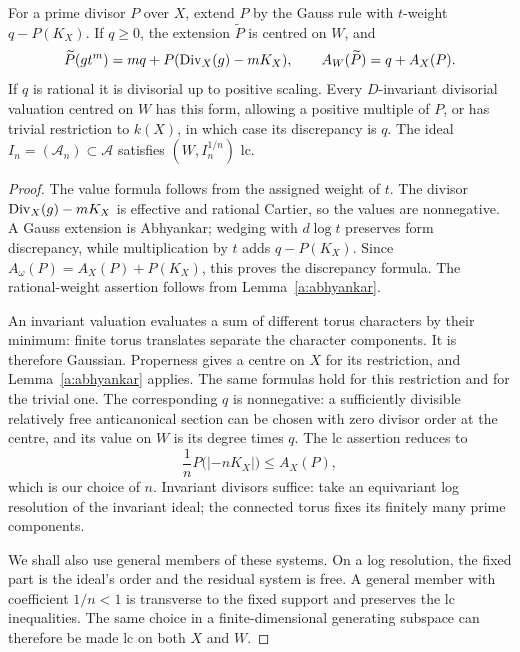 \begin{lemma}\label{a:cone-gauss}
For a prime divisor \(P\) over \(X\), extend \(P\) by the Gauss rule with
\(t\)-weight \(q-P(K_X)\). If \(q\geq0\), the extension \(\widetilde P\)
is centred on \(W\), and
\[
 \widetilde P(gt^m)=mq+P(\operatorname{Div}_X(g)-mK_X),\qquad
 A_W(\widetilde P)=q+A_X(P).
\]
If \(q\) is rational it is divisorial up to positive scaling.
Every \(D\)-invariant divisorial valuation centred on \(W\) has this form,
allowing a positive multiple of \(P\), or has trivial restriction to
\(k(X)\), in which case its discrepancy is \(q\).
The ideal \(I_n=(\mathcal A_n)\subset\mathcal A\) satisfies
\((W,I_n^{1/n})\) lc.
\end{lemma}

\begin{proof}
The value formula follows from the assigned weight of \(t\).
The divisor \(\operatorname{Div}_X(g)-mK_X\) is effective and rational Cartier,
so the values are nonnegative. A Gauss extension is Abhyankar; wedging
with \(d\log t\) preserves form discrepancy, while multiplication by
\(t\) adds \(q-P(K_X)\). Since
\(A_\omega(P)=A_X(P)+P(K_X)\), this proves the discrepancy formula.
The rational-weight assertion follows from Lemma~\ref{a:abhyankar}.

An invariant valuation evaluates a sum of different torus characters
by their minimum: finite torus translates separate the character
components. It is therefore Gaussian. Properness gives a centre on
\(X\) for its restriction, and Lemma~\ref{a:abhyankar} applies.
The same formulas hold for this restriction and for the trivial one.
The corresponding \(q\) is nonnegative: a sufficiently divisible
relatively free anticanonical section can be chosen with zero divisor
order at the centre, and its value on \(W\) is its degree times \(q\).
The lc assertion reduces to
\[
  \frac1n P\bigl(|-nK_X|\bigr)\leq A_X(P),
\]
which is our choice of \(n\). Invariant divisors suffice: take an
equivariant log resolution of the invariant ideal; the connected torus
fixes its finitely many prime components.

We shall also use general members of these systems. On a log resolution,
the fixed part is the ideal's order and the residual system is free.
A general member with coefficient \(1/n<1\) is transverse to the
fixed support and preserves the lc inequalities. The same choice in a
finite-dimensional generating subspace can therefore be made lc on
both \(X\) and \(W\).
\end{proof}

